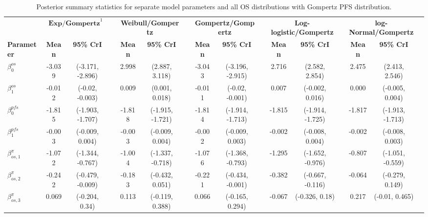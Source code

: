 \documentclass[AMA,STIX1COL]{WileyNJD-v2}
\begin{document}
\begin{landscape}
\begin{center}
\begin{table}[t]
\caption{Posterior summary statistics for separate model parameters and all OS distributions with Gompertz PFS distribution. \label{tab:post_sep_pfs_gompertz}}
\centering
\begin{tabular}{l c c c c c c c c c c c c c c c}
\toprule
\multicolumn{1}{l}{} & \multicolumn{2}{c}{$\textbf{Exp/Gompertz}^1$} & & \multicolumn{2}{c}{\textbf{Weibull/Gompertz}} & & \multicolumn{2}{c}{\textbf{Gompertz/Gompertz}} & & \multicolumn{2}{c}{\textbf{Log-logistic/Gompertz}} & & \multicolumn{2}{c}{\textbf{log-Normal/Gompertz}}\\
\cmidrule{2-3}\cmidrule{5-6}\cmidrule{8-9}\cmidrule{11-12}\cmidrule{14-15}
\textbf{Parameter} & \textbf{Mean} & \textbf{95\% CrI} & & \textbf{Mean} & \textbf{95\% CrI} & & \textbf{Mean} & \textbf{95\% CrI} & & \textbf{Mean} & \textbf{95\% CrI} & & \textbf{Mean} & \textbf{95\% CrI}\\
\midrule
$\beta^{os}_0$ & -3.039 & (-3.171, -2.896) &  & 2.998 & (2.887, 3.118) &  & -3.043 & (-3.196, -2.915) &  & 2.716 & (2.582, 2.854) &  & 2.475 & (2.413, 2.546) & \\
$\beta^{os}_1$ & -0.012 & (-0.02, -0.003) &  & 0.009 & (0.001, 0.018) &  & -0.011 & (-0.02, -0.001) &  & 0.007 & (-0.002, 0.016) &  & 0.000 & (-0.005, 0.004) & \\
$\beta^{pfs}_0$ & -1.815 & (-1.903, -1.707) &  & -1.818 & (-1.915, -1.721) &  & -1.814 & (-1.914, -1.713) &  & -1.815 & (-1.914, -1.725) &  & -1.817 & (-1.913, -1.713) & \\
$\beta^{pfs}_1$ & -0.003 & (-0.009, 0.004) &  & -0.003 & (-0.009, 0.004) &  & -0.002 & (-0.009, 0.003) &  & -0.002 & (-0.008, 0.004) &  & -0.002 & (-0.008, 0.003) & \\
$\beta^{\pi}_{os, 1}$ & -1.072 & (-1.344, -0.767) &  & -1.004 & (-1.337, -0.718) &  & -1.076 & (-1.368, -0.793) &  & -1.295 & (-1.652, -0.976) &  & -0.807 & (-1.051, -0.559) & \\
$\beta^{\pi}_{os, 2}$ & -0.242 & (-0.479, -0.009) &  & -0.183 & (-0.432, 0.051) &  & -0.221 & (-0.434, -0.001) &  & -0.382 & (-0.667, -0.116) &  & -0.064 & (-0.279, 0.149) & \\
$\beta^{\pi}_{os, 3}$ & 0.069 & (-0.204, 0.34) &  & 0.113 & (-0.119, 0.388) &  & 0.066 & (-0.165, 0.294) &  & -0.067 & (-0.326, 0.18) &  & 0.217 & (-0.01, 0.465) & \\

\end{tabular}
\end{table}
\end{center}
\end{landscape}
\end{document}
